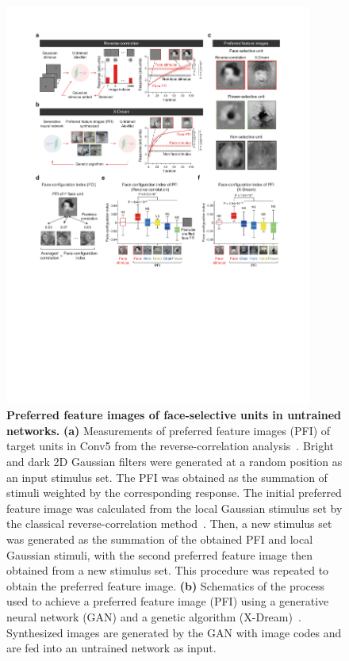 \documentclass[sn-mathphys-num]{sn-jnl}%
\theoremstyle{thmstyleone}%
\theoremstyle{thmstyletwo}%
\theoremstyle{thmstylethree}%
\begin{document}
\begin{figure}[!htb]
	\centering
	\includegraphics[width=0.9\textwidth]{fig/face_2.pdf}
	\caption{
		\textbf{Preferred feature images of face-selective units in untrained networks.
		}
		\textbf{(a)} Measurements of preferred feature images (PFI) of target units in Conv5 from the reverse-correlation analysis~\cite{bonin2011local}.
		Bright and dark 2D Gaussian filters were generated at a random position as an input stimulus set.
		The PFI was obtained as the summation of stimuli weighted by the corresponding response.
		The initial preferred feature image was calculated from the local Gaussian stimulus set by the classical reverse-correlation method~\cite{bonin2011local}.
		Then, a new stimulus set was generated as the summation of the obtained PFI and local Gaussian stimuli, with the second preferred feature image then obtained from a new stimulus set.
		This procedure was repeated to obtain the preferred feature image.
		\textbf{(b)} Schematics of the process used to achieve a preferred feature image (PFI) using a generative neural network (GAN) and a genetic algorithm (X-Dream)~\cite{ponce2019evolving}.
		Synthesized images are generated by the GAN with image codes and are fed into an untrained network as input.
}
\end{figure}
\end{document}
